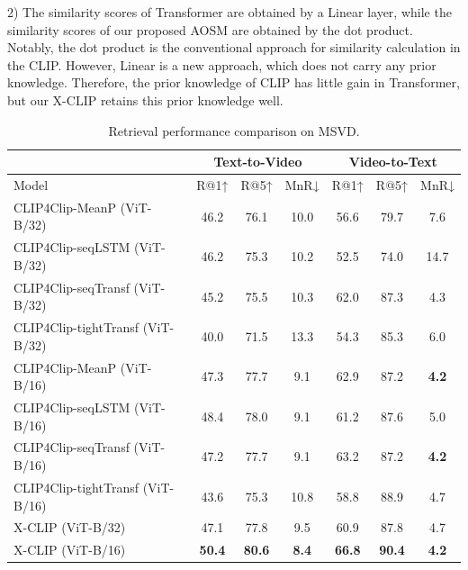 \documentclass[sigconf]{acmart}
\begin{document}
2) The similarity scores of Transformer are obtained by a Linear layer, while the similarity scores of our proposed AOSM are obtained by the dot product. Notably, the dot product is the conventional approach for similarity calculation in the CLIP. However, Linear is a new approach, which does not carry any prior knowledge. Therefore, the prior knowledge of CLIP has little gain in Transformer, but our X-CLIP retains this prior knowledge well.







\begin{table}[]
\caption{Retrieval performance comparison on MSVD.}
\begin{tabular}{l|ccc|ccc}
\hline
              & \multicolumn{3}{c|}{Text-to-Video }                                 & \multicolumn{3}{c}{Video-to-Text }                                 \\
              \hline
Model      & R@1↑          & R@5↑                 & MnR↓          & R@1↑          & R@5↑                   & MnR↓          \\ \hline
CLIP4Clip-MeanP (ViT-B/32)  & 46.2          & 76.1          & 10.0         & 56.6          & 79.7          & 7.6          \\
CLIP4Clip-seqLSTM (ViT-B/32)      & 46.2 & 75.3 & 10.2 & 52.5 & 74.0 & 14.7 \\
CLIP4Clip-seqTransf (ViT-B/32)    & 45.2 & 75.5 & 10.3 & 62.0 & 87.3 & 4.3  \\
CLIP4Clip-tightTransf (ViT-B/32)   & 40.0 & 71.5 & 13.3 & 54.3 & 85.3 & 6.0  \\
CLIP4Clip-MeanP (ViT-B/16)  & 47.3 & 77.7 & 9.1 & 62.9 & 87.2 & \textbf{4.2} \\ 
CLIP4Clip-seqLSTM (ViT-B/16)  & 48.4 & 78.0 & 9.1 & 61.2 & 87.6 & 5.0 \\ 
CLIP4Clip-seqTransf (ViT-B/16)    & 47.2 & 77.7 & 9.1 & 63.2 & 87.2 & \textbf{4.2}  \\
CLIP4Clip-tightTransf (ViT-B/16)    & 43.6 & 75.3 & 10.8 & 58.8 & 88.9 & 4.7  \\
\hline
X-CLIP (ViT-B/32)    & 47.1          & 77.8          & 9.5          & 60.9          & 87.8          & 4.7          \\
X-CLIP (ViT-B/16)    & \textbf{50.4} & \textbf{80.6} & \textbf{8.4} & \textbf{66.8} & \textbf{90.4} & \textbf{4.2} \\ \hline
\end{tabular}
\label{tab:msvd_performance2}
\end{table}
\end{document}
